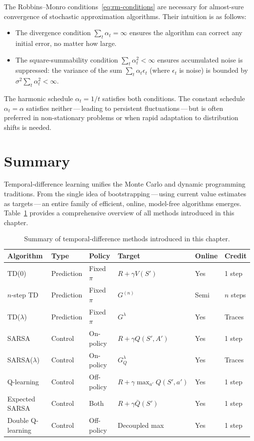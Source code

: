 The Robbins--Monro conditions~\eqref{eq:rm-conditions} are necessary for almost-sure convergence of stochastic approximation algorithms.  Their intuition is as follows:
\begin{itemize}[leftmargin=*]
  \item The divergence condition $\sum_t\alpha_t = \infty$ ensures the algorithm can correct any initial error, no matter how large.
  \item The square-summability condition $\sum_t\alpha_t^2 < \infty$ ensures accumulated noise is suppressed: the variance of the sum $\sum_t\alpha_t\epsilon_t$ (where $\epsilon_t$ is noise) is bounded by $\sigma^2\sum_t\alpha_t^2 < \infty$.
\end{itemize}
The harmonic schedule $\alpha_t = 1/t$ satisfies both conditions.  The constant schedule $\alpha_t = \alpha$ satisfies neither\,---\,leading to persistent fluctuations\,---\,but is often preferred in non-stationary problems or when rapid adaptation to distribution shifts is needed.

\section{Summary}
\label{sec:td-summary}

Temporal-difference learning unifies the Monte Carlo and dynamic programming traditions.  From the single idea of bootstrapping\,---\,using current value estimates as targets\,---\,an entire family of efficient, online, model-free algorithms emerges.  Table~\ref{tab:td-summary} provides a comprehensive overview of all methods introduced in this chapter.

\begin{table}[ht]
\centering
\caption{Summary of temporal-difference methods introduced in this chapter.}
\label{tab:td-summary}
\begin{tabular}{llllll}
\toprule
\textbf{Algorithm} & \textbf{Type} & \textbf{Policy} & \textbf{Target} & \textbf{Online} & \textbf{Credit}\\
\midrule
TD(0) & Prediction & Fixed $\pi$ & $R+\gamma V(S')$ & Yes & 1 step\\
$n$-step TD & Prediction & Fixed $\pi$ & $G^{(n)}$ & Semi & $n$ steps\\
TD($\lambda$) & Prediction & Fixed $\pi$ & $G^\lambda$ & Yes & Traces\\
SARSA & Control & On-policy & $R+\gamma Q(S',A')$ & Yes & 1 step\\
SARSA($\lambda$) & Control & On-policy & $G^\lambda_Q$ & Yes & Traces\\
Q-learning & Control & Off-policy & $R+\gamma\max_{a'}Q(S',a')$ & Yes & 1 step\\
Expected SARSA & Control & Both & $R+\gamma\bar Q(S')$ & Yes & 1 step\\
Double Q-learning & Control & Off-policy & Decoupled max & Yes & 1 step\\
\bottomrule
\end{tabular}
\end{table}

